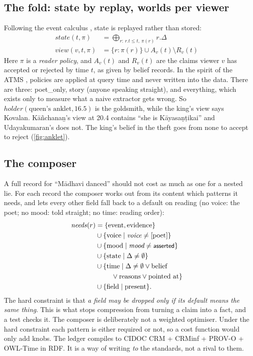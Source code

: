 \documentclass[11pt]{article}
\newcommand{\mood}[1]{\textsf{\small #1}}
\begin{document}
\subsection{The fold: state by replay, worlds per viewer}
Following the event calculus \citep{Kowalski1986LogicbasedCalculus}, state is replayed rather than stored:
\begin{align}
\mathit{state}(t,\pi) &= \textstyle\bigoplus_{r:\,r.t\le t,\ \pi(r)} r.\Delta \\
\mathit{view}(v,t,\pi) &= \{r:\pi(r)\} \cup A_v(t) \setminus R_v(t)
\end{align}
Here $\pi$ is a \emph{reader policy}, and $A_v(t)$ and $R_v(t)$ are the claims viewer $v$ has accepted or rejected by time $t$, as given by belief records. In the spirit of the ATMS \citep{deKleer1986Atms}, policies are applied at query time and never written into the data. There are three: \mood{poet\_only}, \mood{story} (anyone speaking straight), and \mood{everything}, which exists only to measure what a naive extractor gets wrong. So $\mathit{holder}(\text{queen's anklet},16.5)$ is the goldsmith, while the king's view says Kovalan. K\={a}ñchana\b{n}'s view at 20.4 contains ``she is K\={a}yasa\d{n}\d{t}ikai'' and Udayakumaran's does not. The king's belief in the theft goes from none to accept to reject (\cref{fig:anklet}).

\subsection{The composer}
\label{sec:composer-method}
A full record for ``M\={a}dhavi danced'' should not cost as much as one for a nested lie. For each record the composer works out from its content which patterns it needs, and lets every other field fall back to a default on reading (no voice: the poet; no mood: told straight; no time: reading order):
\begin{align*}
\mathit{needs}(r) &= \{\text{event},\text{evidence}\} \\
&\cup \{\text{voice}\mid \textit{voice}\neq[\text{poet}]\} \\
&\cup \{\text{mood}\mid \textit{mood}\neq\mood{asserted}\} \\
&\cup \{\text{state}\mid \Delta\neq\emptyset\} \\
&\cup \{\text{time}\mid \Delta\neq\emptyset \lor \text{belief} \\
&\qquad\ \lor \text{reasons}\lor \text{pointed at}\} \\
&\cup \{\text{field}\mid\text{present}\}.
\end{align*}
The hard constraint is that \emph{a field may be dropped only if its default means the same thing}. This is what stops compression from turning a claim into a fact, and a test checks it. The composer is deliberately not a weighted optimiser. Under the hard constraint each pattern is either required or not, so a cost function would only add knobs. The ledger compiles to CIDOC CRM + CRMinf + PROV-O + OWL-Time in RDF. It is a way of writing \emph{to} the standards, not a rival to them.
\end{document}
